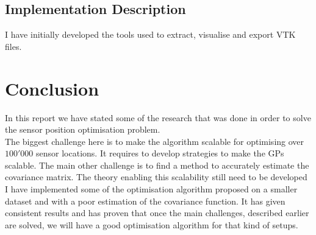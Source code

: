 \documentclass[12pt,twoside]{report}
\begin{document}
\section{Implementation Description}

I have initially developed the tools used to extract, visualise and export VTK files. 

\subsection{}



\chapter{Conclusion}

In this report we have stated some of the research that was done in order to solve the sensor position optimisation problem. \\ 

The biggest challenge here is to make the algorithm scalable for optimising over $100'000$ sensor locations. It requires to develop strategies to make the GPs scalable. The main other challenge is to find a method to accurately estimate the covariance matrix. The theory enabling this scalability still need to be developed \\

I have implemented some of the optimisation algorithm proposed on a smaller dataset and with a poor estimation of the covariance function. It has given consistent results and has proven that once the main challenges, described earlier are solved, we will have a good optimisation algorithm for that kind of setups. 

 







\end{document}
